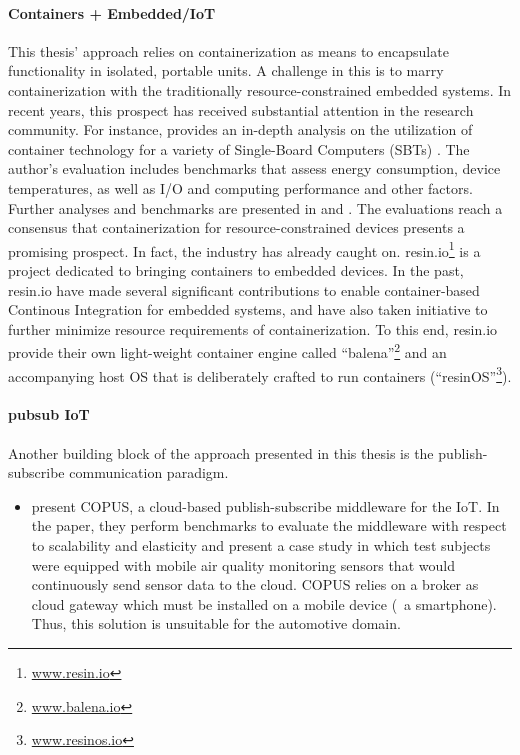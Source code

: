 \paragraph{Containers + Embedded/IoT}
This thesis' approach relies on containerization as means to encapsulate functionality in isolated, portable units. A challenge in this is to marry containerization with the traditionally resource-constrained embedded systems. In recent years, this prospect has received substantial attention in the research community. For instance, \citeauthor*{morabito2017virtualization} provides an in-depth analysis on the utilization of container technology for a variety of Single-Board Computers (SBTs) \cite{morabito2017virtualization}. The author's evaluation includes benchmarks that assess energy consumption, device temperatures, as well as I/O and computing performance and other factors.
Further analyses and benchmarks are presented in \cite{pahl2015containers} and \cite{bellavista2017feasibility}.  
The evaluations reach a consensus that containerization for resource-constrained devices presents a promising prospect. 
In fact, the industry has already caught on.
resin.io\footnote{\url{www.resin.io}} is a project dedicated to bringing containers to embedded devices. In the past, resin.io have made several significant contributions to enable container-based Continous Integration for embedded systems, and have also taken initiative to further minimize resource requirements of containerization. To this end, resin.io provide their own light-weight container engine called ``balena''\footnote{\url{www.balena.io}} and an accompanying host OS that is deliberately crafted to run containers (``resinOS''\footnote{\url{www.resinos.io}}).


\paragraph{pubsub IoT}
Another building block of the approach presented in this thesis is the publish-subscribe communication paradigm.

\begin{itemize}
	\item \citeauthor*{antonic2016mobile} \cite{antonic2016mobile} present COPUS, a cloud-based publish-subscribe middleware for the IoT. In the paper, they perform benchmarks to evaluate the middleware with respect to scalability and elasticity and present a case study in which test subjects were equipped with mobile air quality monitoring sensors that would continuously send sensor data to the cloud. COPUS relies on a broker as cloud gateway which must be installed on a mobile device (\eg\ a smartphone). Thus, this solution is unsuitable for the automotive domain. 
\end{itemize}


